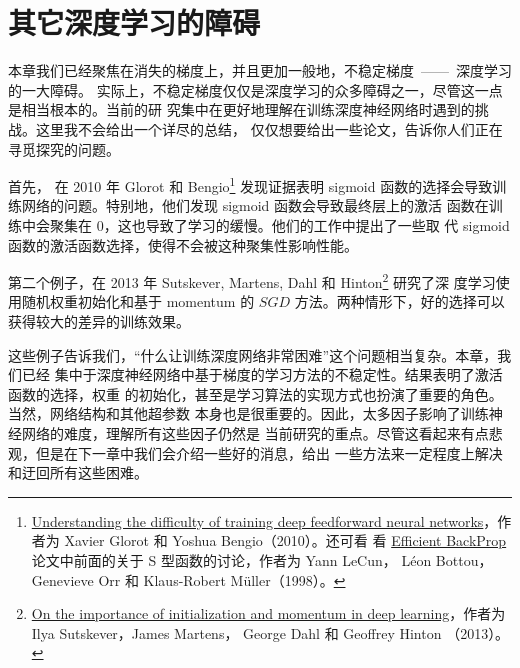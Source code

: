 \section{其它深度学习的障碍}

本章我们已经聚焦在消失的梯度上，并且更加一般地，不稳定梯度~——~深度学习的一大障碍。
实际上，不稳定梯度仅仅是深度学习的众多障碍之一，尽管这一点是相当根本的。当前的研
究集中在更好地理解在训练深度神经网络时遇到的挑战。这里我不会给出一个详尽的总结，
仅仅想要给出一些论文，告诉你人们正在寻觅探究的问题。
 
首先，
在 2010 年 Glorot 和
Bengio\footnote{\href{http://jmlr.org/proceedings/papers/v9/glorot10a/glorot10a.pdf}{Understanding
    the difficulty of training deep feedforward neural networks}，作者为 Xavier
  Glorot 和 Yoshua Bengio（2010）。还可看
  看 \href{http://yann.lecun.com/exdb/publis/pdf/lecun-98b.pdf}{Efficient
    BackProp} 论文中前面的关于 S 型函数的讨论，作者为 Yann LeCun， Léon
  Bottou， Genevieve Orr 和 Klaus-Robert Müller（1998）。} 发现证据表明 sigmoid
函数的选择会导致训练网络的问题。特别地，他们发现 sigmoid 函数会导致最终层上的激活
函数在训练中会聚集在 $0$，这也导致了学习的缓慢。他们的工作中提出了一些取
代 sigmoid 函数的激活函数选择，使得不会被这种聚集性影响性能。
 
第二个例子，在 2013 年 Sutskever, Martens, Dahl 和
Hinton\footnote{\href{http://www.cs.toronto.edu/~hinton/absps/momentum.pdf}{On
    the importance of initialization and momentum in deep learning}，作者为 Ilya
  Sutskever，James Martens， George Dahl 和 Geoffrey Hinton （2013）。} 研究了深
度学习使用随机权重初始化和基于 momentum 的 $SGD$ 方法。两种情形下，好的选择可以
获得较大的差异的训练效果。

这些例子告诉我们，“什么让训练深度网络非常困难”这个问题相当复杂。本章，我们已经
集中于深度神经网络中基于梯度的学习方法的不稳定性。结果表明了激活函数的选择，权重
的初始化，甚至是学习算法的实现方式也扮演了重要的角色。当然，网络结构和其他超参数
本身也是很重要的。因此，太多因子影响了训练神经网络的难度，理解所有这些因子仍然是
当前研究的重点。尽管这看起来有点悲观，但是在下一章中我们会介绍一些好的消息，给出
一些方法来一定程度上解决和迂回所有这些困难。
